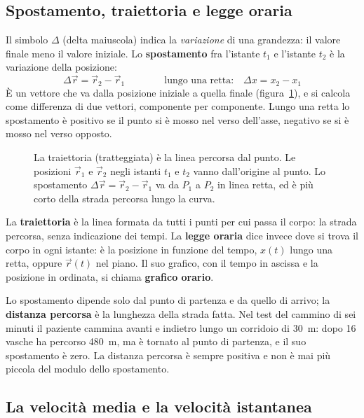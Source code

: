 \subsection{Spostamento, traiettoria e legge oraria}

Il simbolo $\Delta$ (delta maiuscola) indica la \emph{variazione} di una grandezza: il valore finale meno il valore iniziale. Lo \textbf{spostamento} fra l'istante $t_1$ e l'istante $t_2$ è la variazione della posizione:
\[
  \Delta\vec r = \vec r_2 - \vec r_1 \qquad\qquad \text{lungo una retta:}\quad \Delta x = x_2 - x_1
\]
È un vettore che va dalla posizione iniziale a quella finale (figura~\ref{fig:ud2-traiettoria}), e si calcola come differenza di due vettori, componente per componente. Lungo una retta lo spostamento è positivo se il punto si è mosso nel verso dell'asse, negativo se si è mosso nel verso opposto.

\begin{figure}[h]
\centering

\caption{La traiettoria (tratteggiata) è la linea percorsa dal punto. Le posizioni $\vec r_1$ e $\vec r_2$ negli istanti $t_1$ e $t_2$ vanno dall'origine al punto. Lo spostamento $\Delta\vec r = \vec r_2 - \vec r_1$ va da $P_1$ a $P_2$ in linea retta, ed è più corto della strada percorsa lungo la curva.}
\label{fig:ud2-traiettoria}
\end{figure}

La \textbf{traiettoria} è la linea formata da tutti i punti per cui passa il corpo: la strada percorsa, senza indicazione dei tempi. La \textbf{legge oraria} dice invece dove si trova il corpo in ogni istante: è la posizione in funzione del tempo, $x(t)$ lungo una retta, oppure $\vec r(t)$ nel piano. Il suo grafico, con il tempo in ascissa e la posizione in ordinata, si chiama \textbf{grafico orario}.

\begin{attenzione}
Lo spostamento dipende solo dal punto di partenza e da quello di arrivo; la \textbf{distanza percorsa} è la lunghezza della strada fatta. Nel test del cammino di sei minuti il paziente cammina avanti e indietro lungo un corridoio di \SI{30}{\metre}: dopo 16 vasche ha percorso \SI{480}{\metre}, ma è tornato al punto di partenza, e il suo spostamento è zero. La distanza percorsa è sempre positiva e non è mai più piccola del modulo dello spostamento.
\end{attenzione}

\subsection{La velocità media e la velocità istantanea}

